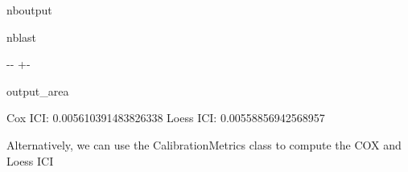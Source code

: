 \documentclass[letterpaper,10pt,english]{sphinxmanual}
\begin{document}
\begin{sphinxuseclass}{nboutput}
\begin{sphinxuseclass}{nblast}
{

\kern-\sphinxverbatimsmallskipamount\kern-\baselineskip
\kern+\FrameHeightAdjust\kern-\fboxrule
\vspace{\nbsphinxcodecellspacing}

\begin{sphinxuseclass}{output_area}
\begin{sphinxuseclass}{}


\begin{sphinxVerbatim}[commandchars=\\\{\}]
Cox ICI: 0.005610391483826338
Loess ICI: 0.00558856942568957
\end{sphinxVerbatim}



\end{sphinxuseclass}
\end{sphinxuseclass}
}

\end{sphinxuseclass}
\end{sphinxuseclass}
\sphinxAtStartPar
Alternatively, we can use the CalibrationMetrics class to compute the COX and Loess ICI
\end{document}

